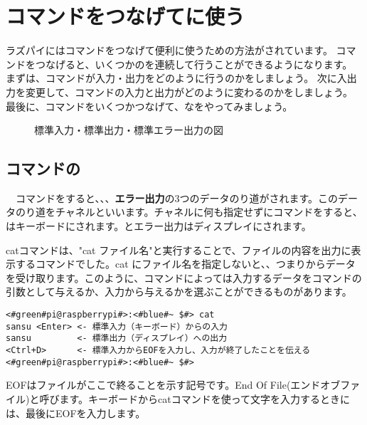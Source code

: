 \newpage
\section{コマンドをつなげてに使う}
ラズパイにはコマンドをつなげて便利に使うための方法がされています。
コマンドをつなげると、いくつかのを連続して行うことができるようになります。
まずは、コマンドが入力・出力をどのように行うのかをしましょう。
次に入出力を変更して、コマンドの入力と出力がどのように変わるのかをしましょう。
最後に、コマンドをいくつかつなげて、なをやってみましょう。

\begin{figure}[h]
    \centering
    
    \caption{標準入力・標準出力・標準エラー出力の図}
    \label{ch03:stdioerr}
\end{figure}

\subsection{コマンドの}
　コマンドをすると、{\bf {}}、{\bf {}}、{\bf {}エラー出力}の3つのデータのり道がされます。このデータのり道をチャネルといいます。チャネルに何も指定せずにコマンドをすると、はキーボードにされます。とエラー出力はディスプレイにされます。

catコマンドは、"cat ファイル名"と実行することで、ファイルの内容を出力に表示するコマンドでした。cat にファイル名を指定しないと、、つまりからデータを受け取ります。このように、コマンドによっては入力するデータをコマンドの引数として与えるか、入力から与えるかを選ぶことができるものがあります。

\begin{lstlisting}[caption=catの標準入力・標準出力, label=stdioCat]
<#green#pi@raspberrypi#>:<#blue#~ $#> cat 
sansu <Enter> <- 標準入力（キーボード）からの入力
sansu         <- 標準出力（ディスプレイ）への出力
<Ctrl+D>      <- 標準入力からEOFを入力し、入力が終了したことを伝える
<#green#pi@raspberrypi#>:<#blue#~ $#>
\end{lstlisting}
EOFはファイルがここで終ることを示す記号です。End Of File(エンドオブファイル)と呼びます。キーボードからcatコマンドを使って文字を入力するときには、最後にEOFを入力します。

